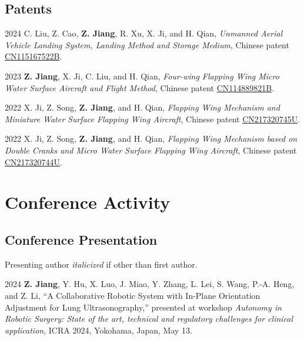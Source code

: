 \documentclass[11pt,letterpaper]{report}
\begin{document}
\subsection*{Patents}
\begin{tablist}	
	\item[2024]   \tab{}C. Liu, Z. Cao, \textbf{Z. Jiang}, R. Xu, X. Ji, and H. Qian, \textit{Unmanned Aerial Vehicle Landing System, Landing Method and Storage Medium}, Chinese patent \href{https://patents.google.com/patent/CN115167522B/en?oq=CN115167522B}{CN115167522B}.	
	
	\item[2023]   \tab{}\textbf{Z. Jiang}, X. Ji, C. Liu, and H. Qian, \textit{Four-wing Flapping Wing Micro Water Surface Aircraft and Flight Method}, Chinese patent \href{https://patents.google.com/patent/CN114889821B/en?oq=CN114889821B}{CN114889821B}.
	
	\item[2022]   \tab{}X. Ji, Z. Song, \textbf{Z. Jiang}, and H. Qian, \textit{Flapping Wing Mechanism and Miniature Water Surface Flapping Wing Aircraft}, Chinese patent \href{https://patents.google.com/patent/CN217320745U/en?oq=CN217320745U}{CN217320745U}.  
	
	\item[2022]   \tab{}X. Ji, Z. Song, \textbf{Z. Jiang}, and H. Qian, \textit{Flapping Wing Mechanism based on Double Cranks and Micro Water Surface Flapping Wing Aircraft}, Chinese patent \href{https://patents.google.com/patent/CN217320744U/en?oq=CN217320744U}{CN217320744U}.  
\end{tablist}

\section*{Conference Activity}
\subsection*{Conference Presentation}
Presenting author \textit{italicized} if other than first author.\vspace{1ex}\\
\begin{tablist}	
	\item[2024] \tab \textbf{Z. Jiang}, Y. Hu, X. Luo, J. Miao, Y. Zhang, L. Lei, S. Wang, P.-A. Heng, and Z. Li, ``A Collaborative Robotic System with In-Plane Orientation Adjustment for Lung Ultrasonography,'' presented at workshop \textit{Autonomy in Robotic Surgery: State of the art, technical and regulatory challenges for clinical application}, ICRA 2024, Yokohama, Japan, May 13.
\end{tablist}
	
\end{document}
